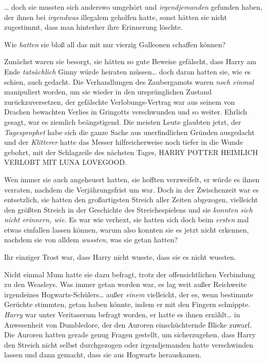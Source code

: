 {… doch sie mussten sich anderswo umgehört und \emph{irgendjemanden} gefunden haben, der ihnen bei \emph{irgendwas} illegalem geholfen hatte, sonst hätten sie nicht zugestimmt, dass man hinterher ihre Erinnerung löschte.

Wie \emph{hatten} sie bloß all das mit nur vierzig Galleonen schaffen können?

Zunächst waren sie besorgt, sie hätten so gute Beweise gefälscht, dass Harry am Ende \emph{tatsächlich} Ginny würde heiraten müssen… doch daran hatten sie, wie es schien, auch gedacht. Die Verhandlungen des Zaubergamots waren \emph{noch einmal} manipuliert worden, um sie wieder in den ursprünglichen Zustand zurückzuversetzen, der gefälschte Verlobungs-Vertrag war aus seinem von Drachen bewachten Verlies in Gringotts verschwunden und so weiter. Ehrlich gesagt, war es ziemlich beängstigend. Die meisten Leute glaubten jetzt, der \emph{Tagesprophet} habe sich die ganze Sache aus unerfindlichen Gründen ausgedacht und der \emph{Klitterer} hatte das Messer hilfreicherweise noch tiefer in die Wunde gebohrt, mit der Schlagzeile des nächsten Tages, HARRY POTTER HEIMLICH VERLOBT MIT LUNA LOVEGOOD.

Wen immer sie auch angeheuert hatten, sie hofften verzweifelt, er würde es ihnen verraten, nachdem die Verjährungsfrist um war. Doch in der Zwischenzeit war es entsetzlich, sie hatten den großartigsten Streich aller Zeiten abgezogen, vielleicht den größten Streich in der Geschichte des Streichespielens und sie \emph{konnten sich nicht erinnern, wie.} Es war wie verhext, sie hatten sich doch beim \emph{ersten} mal etwas einfallen lassen können, warum also konnten sie es jetzt nicht erkennen, nachdem sie von alldem \emph{wussten}, was sie getan hatten?

Ihr einziger Trost war, dass Harry nicht wusste, dass sie es nicht wussten.

Nicht einmal Mum hatte sie dazu befragt, trotz der offensichtlichen Verbindung zu den Weasleys. Was immer getan worden war, es lag weit außer Reichweite irgendeines Hogwarts-Schülers… außer \emph{einem} vielleicht, der es, wenn bestimmte Gerüchte stimmten, getan haben könnte, indem er mit den Fingern schnippte. \emph{Harry} war unter Veritaserum befragt worden, er hatte es ihnen erzählt… in Anwesenheit von Dumbledore, der den Auroren einschüchternde Blicke zuwarf. Die Auroren hatten gerade genug Fragen gestellt, um sicherzugehen, dass Harry den Streich nicht selbst durchgezogen oder irgendjemanden hatte verschwinden lassen und dann gemacht, dass sie aus Hogwarts herauskamen.

}
